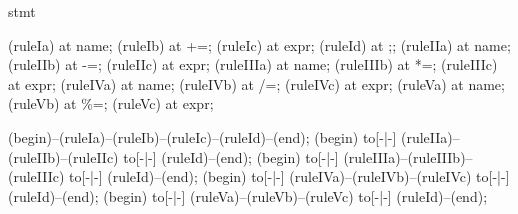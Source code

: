 \begin{syntax}{stmt}
  
  \node[nonterminal] (ruleIa)  at  {name};
  \node[terminal]    (ruleIb)  at  {+=};
  \node[nonterminal] (ruleIc)  at  {expr};
  \node[terminal]    (ruleId)  at  {;};
  \node[nonterminal] (ruleIIa) at  {name};
  \node[terminal]    (ruleIIb) at  {-=};
  \node[nonterminal] (ruleIIc) at  {expr};
  \node[nonterminal] (ruleIIIa) at  {name};
  \node[terminal]    (ruleIIIb) at  {*=};
  \node[nonterminal] (ruleIIIc) at  {expr};
  \node[nonterminal] (ruleIVa) at  {name};
  \node[terminal]    (ruleIVb) at  {/=};
  \node[nonterminal] (ruleIVc) at  {expr};
  \node[nonterminal] (ruleVa) at  {name};
  \node[terminal]    (ruleVb) at  {\%=};
  \node[nonterminal] (ruleVc) at  {expr};
  
  \draw[path] (begin)--(ruleIa)--(ruleIb)--(ruleIc)--(ruleId)--(end);
  \draw[path] (begin) to[-|-] (ruleIIa)--(ruleIIb)--(ruleIIc) to[-|-] (ruleId)--(end);
  \draw[path] (begin) to[-|-] (ruleIIIa)--(ruleIIIb)--(ruleIIIc) to[-|-] (ruleId)--(end);
  \draw[path] (begin) to[-|-] (ruleIVa)--(ruleIVb)--(ruleIVc) to[-|-] (ruleId)--(end);
  \draw[path] (begin) to[-|-] (ruleVa)--(ruleVb)--(ruleVc) to[-|-] (ruleId)--(end);
\end{syntax}
